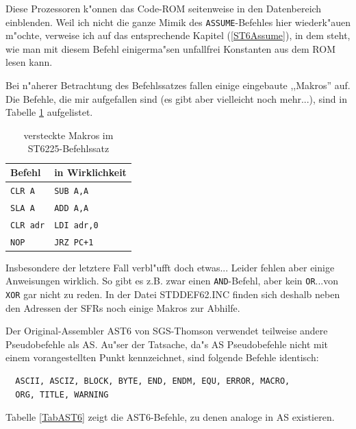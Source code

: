 \documentclass[12pt,a4paper,twoside]{report}
\newcommand{\tty}[1]{{\tt #1}}
\newcommand{\asname}{AS}
\begin{document}
Diese Prozessoren k"onnen das Code-ROM seitenweise in den Datenbereich
einblenden.  Weil ich nicht die ganze Mimik des \tty{ASSUME}-Befehles
hier wiederk"auen m"ochte, verweise ich auf das entsprechende Kapitel
(\ref{ST6Assume}), in dem steht, wie man mit diesem Befehl einigerma"sen
unfallfrei Konstanten aus dem ROM lesen kann.
\par
Bei n"aherer Betrachtung des Befehlssatzes fallen einige eingebaute
,,Makros'' auf.  Die Befehle, die mir aufgefallen sind (es gibt aber
vielleicht noch mehr...), sind in Tabelle \ref{TabHid62} aufgelistet.
\par
\begin{table}[htbp]
\begin{center}\begin{tabular}{|l|l|}
\hline
Befehl   & in Wirklichkeit \\
\hline
\hline
\tty{CLR A}    & \tty{SUB A,A} \\
\tty{SLA A}    & \tty{ADD A,A} \\
\tty{CLR adr}  & \tty{LDI adr,0} \\
\tty{NOP}      & \tty{JRZ PC+1} \\
\hline
\end{tabular}\end{center}
\caption{versteckte Makros im ST6225-Befehlssatz\label{TabHid62}}
\end{table}
Insbesondere der letztere Fall verbl"ufft doch etwas...
Leider fehlen aber einige Anweisungen wirklich.  So gibt es z.B. zwar einen
\tty{AND}-Befehl, aber kein \tty{OR}...von \tty{XOR} gar nicht zu
reden.  In der Datei  STDDEF62.INC finden sich deshalb neben den Adressen
der SFRs noch einige Makros zur Abhilfe.
\par
Der Original-Assembler AST6 von SGS-Thomson verwendet teilweise andere
Pseudobefehle als \asname{}.  Au"ser der Tatsache, da"s \asname{} Pseudobefehle nicht
mit einem vorangestellten Punkt kennzeichnet, sind folgende Befehle
identisch:
\begin{verbatim}
  ASCII, ASCIZ, BLOCK, BYTE, END, ENDM, EQU, ERROR, MACRO,
  ORG, TITLE, WARNING
\end{verbatim}
Tabelle \ref{TabAST6} zeigt die AST6-Befehle, zu denen analoge in \asname{}
existieren.
\par
\end{document}
